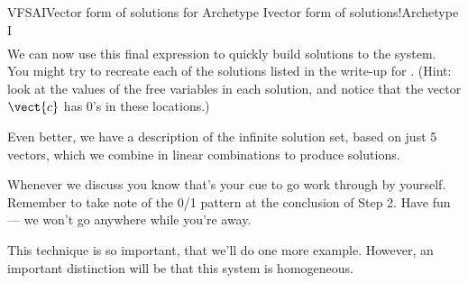 \begin{example}{VFSAI}{Vector form of solutions for Archetype I}{vector form of solutions!Archetype I}
\begin{align*}
\end{align*}
%
We can now use this final expression to quickly build solutions to the system.  You might try to recreate each of the solutions listed in the write-up for .  (Hint: look at the values of the free variables in each solution, and notice that the vector $\vect{c}$ has 0's in these locations.)\par
%
Even better, we have a description of the infinite solution set, based on just 5 vectors, which we combine in linear combinations to produce solutions.\par
%
Whenever we discuss  you know that's your cue to go work through  by yourself.  Remember to take note of the 0/1 pattern at the conclusion of Step 2.  Have fun --- we won't go anywhere while you're away.
%
\end{example}
%
This technique is so important, that we'll do one more example.  However, an important distinction will be that this system is homogeneous.
%
